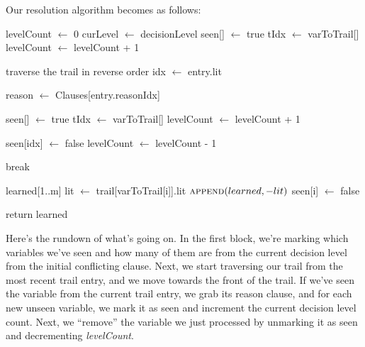 Our resolution algorithm becomes as follows:
\begin{algorithm}[H]
\caption{Improved First UIP}\label{alg:34}
\begin{algorithmic}[1]

\State levelCount $\gets$ 0
\State curLevel $\gets$ decisionLevel
        \State seen[] $\gets$ true 
        \State tIdx $\gets$ varToTrail[]
            \State levelCount $\gets$ levelCount + 1
        \EndIf
    \EndIf
\EndFor

 \Comment traverse the trail in reverse order
    \State idx $\gets$ entry.lit

        \State reason $\gets$ Clauses[entry.reasonIdx]

                \State seen[] $\gets$ true
                \State tIdx $\gets$ varToTrail[]
                    \State levelCount $\gets$ levelCount + 1
                \EndIf
            \EndIf
        \EndFor

        \State seen[idx] $\gets$ false
        \State levelCount $\gets$ levelCount - 1
    \EndIf

        \State break
    \EndIf
\EndFor

\State learned[1..m]
        \State lit $\gets$ trail[varToTrail[i]].lit
        \State $\Call{append}{learned, -lit}$
        \State seen[i] $\gets$ false
    \EndIf
\EndFor

\State return learned

\EndProcedure
\end{algorithmic}
\end{algorithm}

\noindent
Here's the rundown of what's going on. In the first block, we're marking which 
variables we've seen and how many of them are from the current decision level from 
the initial conflicting clause. Next, we start traversing our trail from the most recent 
trail entry, and we move towards the front of the trail. If we've seen the variable from 
the current trail entry, we grab its reason clause, and for each new unseen variable, 
we mark it as seen and increment the current decision level count. Next, we ``remove''
the variable we just processed by unmarking it as seen and decrementing \textit{levelCount}.

